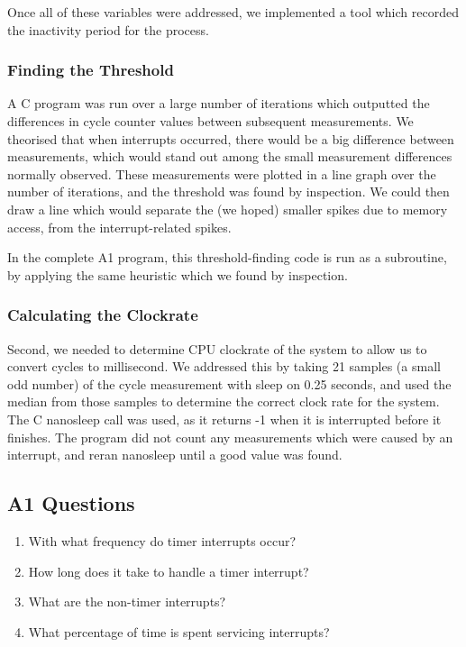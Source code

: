 \documentclass[a4paper, 12pt]{article}
\begin{document}
Once all of these variables were addressed, we implemented a tool which recorded the inactivity period for the process.

\subsubsection{Finding the Threshold}

A C program was run over a large number of iterations which outputted the differences in cycle counter values between subsequent measurements. We theorised that when interrupts occurred, there would be a big difference between measurements, which would stand out among the small measurement differences normally observed. These measurements were plotted in a line graph over the number of iterations, and the threshold was found by inspection. We could then draw a line which would separate the (we hoped) smaller spikes due to memory access, from the interrupt-related spikes. 

In the complete A1 program, this threshold-finding code is run as a subroutine, by applying the same heuristic which we found by inspection.

\subsubsection{Calculating the Clockrate}

Second, we needed to determine CPU clockrate of the system to allow us to convert cycles to millisecond. We addressed this by taking 21 samples (a small odd number) of the cycle measurement with sleep on 0.25 seconds, and used the median from those samples to determine the correct clock rate for the system. The C nanosleep call was used, as it returns -1 when it is interrupted before it finishes. The program did not count any measurements which were caused by an interrupt, and reran nanosleep until a good value was found.

\subsection{A1 Questions}
\begin{enumerate}
\item   With what frequency do timer interrupts occur?
\item   How long does it take to handle a timer interrupt?
\item   What are the non-timer interrupts?
\item   What percentage of time is spent servicing interrupts?
\end{enumerate}
\end{document}
